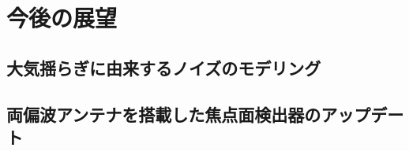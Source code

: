 \chapter{今後の展望}
\label{chapter5}

\section{大気揺らぎに由来するノイズのモデリング}
\label{atmos_model}

\section{両偏波アンテナを搭載した焦点面検出器のアップデート}
